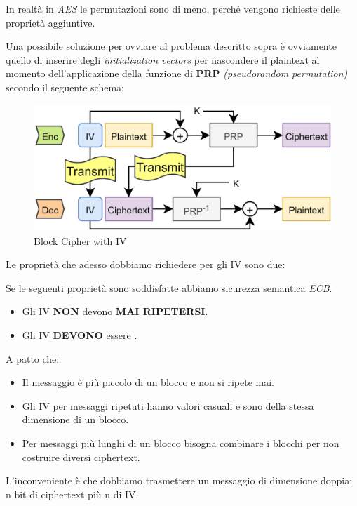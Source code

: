 \begin{remark}In realtà in \textit{AES} le permutazioni sono di meno, perché vengono richieste delle proprietà aggiuntive.
\end{remark}
Una possibile soluzione per ovviare al problema descritto sopra è ovviamente quello di inserire degli \textit{initialization vectors} per nascondere il plaintext al momento dell'applicazione della funzione di \textbf{PRP} \textit{(pseudorandom permutation)} secondo il seguente schema:
\begin{figure}[H]
    \centering
    \includegraphics[width=\linewidth]{image/blockiv.png}
    \caption{Block Cipher with IV}
    \label{fig:blockiv}
\end{figure}
Le proprietà che adesso dobbiamo richiedere per gli IV sono due:
\begin{theorem}
Se le seguenti proprietà sono soddisfatte abbiamo sicurezza semantica \textit{ECB}.
\begin{property}
\begin{itemize}
    \item Gli IV \textbf{NON} devono \textbf{MAI RIPETERSI}.
    \item Gli IV \textbf{DEVONO} essere .
\end{itemize}
\end{property}
A patto che:
\begin{itemize}
    \item Il messaggio è più piccolo di un blocco e non si ripete mai.
    \item Gli IV per messaggi ripetuti hanno valori casuali e sono della stessa dimensione di un blocco.
    \item Per messaggi più lunghi di un blocco bisogna combinare i blocchi per non costruire diversi ciphertext.
\end{itemize}
\begin{remark}
L'inconveniente è che dobbiamo trasmettere un messaggio di dimensione doppia: n bit di ciphertext più n di IV. 
\end{remark}
\end{theorem}
